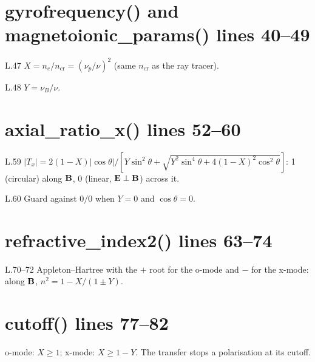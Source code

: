 \section*{\normalsize gyrofrequency() and magnetoionic\_params() \hfill{\small\mdseries\color{gray}lines 40--49}}

\begin{lines}
\item[L.47] $X=n_e/n_\text{cr}=(\nu_p/\nu)^2$ (same $n_\text{cr}$ as the ray tracer).
\item[L.48] $Y=\nu_B/\nu$.
\end{lines}
\section*{\normalsize axial\_ratio\_x() \hfill{\small\mdseries\color{gray}lines 52--60}}

\begin{lines}
\item[L.59] $|T_x|=2(1-X)|\cos\theta|/[Y\sin^2\theta+\sqrt{Y^2\sin^4\theta+4(1-X)^2\cos^2\theta}]$: 1 (circular) along $\mathbf{B}$, 0 (linear, $\mathbf{E}\perp\mathbf{B}$) across it.
\item[L.60] Guard against $0/0$ when $Y=0$ and $\cos\theta=0$.
\end{lines}
\section*{\normalsize refractive\_index2() \hfill{\small\mdseries\color{gray}lines 63--74}}

\begin{lines}
\item[L.70–72] Appleton--Hartree with the $+$ root for the o-mode and $-$ for the x-mode: along $\mathbf{B}$, $n^2=1-X/(1\pm Y)$.
\end{lines}
\section*{\normalsize cutoff() \hfill{\small\mdseries\color{gray}lines 77--82}}

o-mode: $X\ge1$; x-mode: $X\ge1-Y$. The transfer stops a polarisation at its cutoff.


